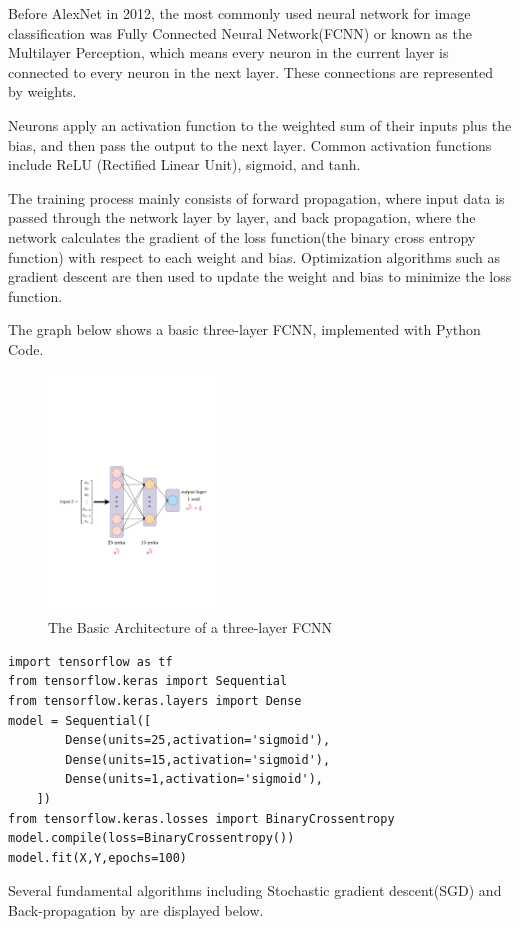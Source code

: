 \documentclass[a4paper]{article}
\begin{document}
Before AlexNet\citep{Krizhevsky2012ImageNetCW} in 2012, the most commonly used neural network for image classification was Fully Connected Neural Network(FCNN) or known as the Multilayer Perception\citep{RN31}, which means every neuron in the current layer is connected to every neuron in the next layer. These connections are represented by weights.

Neurons apply an activation function to the weighted sum of their inputs plus the bias, and then pass the output to the next layer. Common activation functions include ReLU (Rectified Linear Unit)\citep{Nair2010RectifiedLU}, sigmoid, and tanh.

The training process mainly consists of forward propagation, where input data is passed through the network layer by layer, and back propagation\citep{RN32}, where the network calculates the gradient of the loss function(the binary cross entropy function) with respect to each weight and bias. Optimization algorithms such as gradient descent are then used to update the weight and bias to minimize the loss function.

The graph below shows a basic three-layer FCNN, implemented with Python Code. 
\begin{figure}[ht]
    \centering
    \includegraphics[width=0.4\textwidth,height=0.25\textwidth]{images/pic1.drawio.pdf}
    \caption{The Basic Architecture of a three-layer FCNN}
    \label{fig:enter-label}
\end{figure}



\begin{lstlisting}
import tensorflow as tf
from tensorflow.keras import Sequential
from tensorflow.keras.layers import Dense
model = Sequential([
        Dense(units=25,activation='sigmoid'),
        Dense(units=15,activation='sigmoid'),
        Dense(units=1,activation='sigmoid'),
    ])
from tensorflow.keras.losses import BinaryCrossentropy
model.compile(loss=BinaryCrossentropy())
model.fit(X,Y,epochs=100)
\end{lstlisting}


Several fundamental algorithms including Stochastic gradient descent(SGD)\citep{Bottou2012StochasticGD} and Back-propagation by \citet{RN32} are displayed below. 
\end{document}
